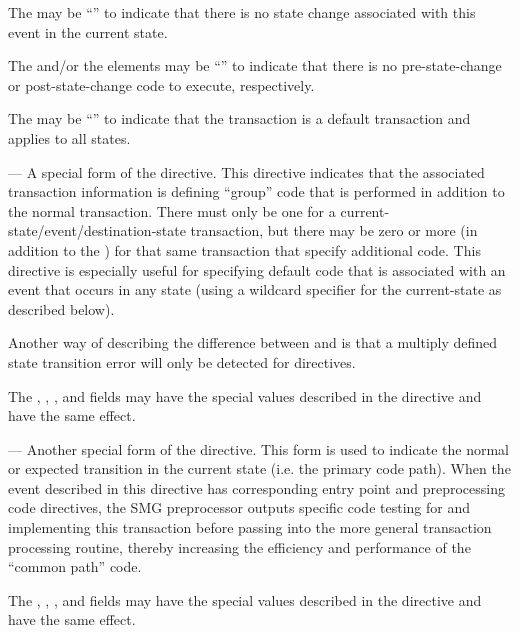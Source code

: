 \begin{description}
  The  may be ``\smg{--}'' to indicate that there is
  no state change associated with this event in the current state.
  
  The  and/or the  elements
  may be ``\smg{--}'' to indicate that there is no pre-state-change or
  post-state-change code to execute, respectively.
  
  The  may be ``\smg{*}'' to indicate that the
  transaction is a default transaction and applies to all states.
  
\item[\hypertarget{TRANSplus}{\smg{TRANS+}}] --- A special form of the
  \TRANS directive.  This directive indicates that the associated
  transaction information is defining ``group'' code that is performed
  in addition to the normal transaction.  There must only be one
  \TRANS for a current-state/event/destination-state transaction, but
  there may be zero or more  (in addition to the \TRANS)
  for that same transaction that specify additional code.  This
  directive is especially useful for specifying default code that is
  associated with an event that occurs in any state (using a wildcard
  specifier for the current-state as described below).
  
  Another way of describing the difference between \TRANS and
   is that a multiply defined state transition error will
  only be detected for \TRANS directives.
  
  The , , ,
  and  fields may have the special values
  described in the \TRANS directive and have the same effect.

\item[\hypertarget{TRANSeq}{\smg{TRANS=}}] --- Another special form of
  the \TRANS directive.  This form is used to indicate the normal or
  expected transition in the current state (i.e. the primary code
  path).  When the event described in this  directive has
  corresponding entry point and preprocessing code directives, the SMG
  preprocessor outputs specific code testing for and implementing this
  transaction before passing into the more general transaction
  processing routine, thereby increasing the efficiency and
  performance of the ``common path'' code.
  
  The , , ,
  and  fields may have the special values
  described in the \TRANS directive and have the same effect.


\end{description}
